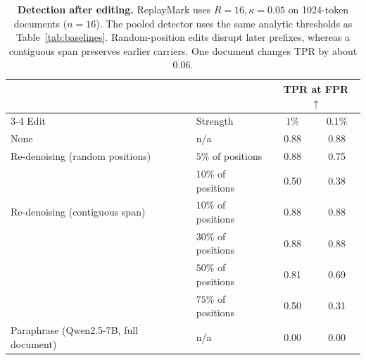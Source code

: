 \begin{table}[H]
\centering
\small
\renewcommand{\arraystretch}{0.86}
\begin{tabular}{llcc}
\toprule
& & \multicolumn{2}{c}{TPR at FPR $\uparrow$} \\
\cmidrule(lr){3-4}
Edit & Strength & $1\%$ & $0.1\%$ \\
\midrule
None & n/a & 0.88 & 0.88 \\
Re-denoising (random positions) & $5\%$ of positions & 0.88 & 0.75 \\
                                & $10\%$ of positions & 0.50 & 0.38 \\
Re-denoising (contiguous span)  & $10\%$ of positions & 0.88 & 0.88 \\
                                & $30\%$ of positions & 0.88 & 0.88 \\
                                & $50\%$ of positions & 0.81 & 0.69 \\
                                & $75\%$ of positions & 0.50 & 0.31 \\
Paraphrase (Qwen2.5-7B, full document) & n/a & 0.00 & 0.00 \\
\bottomrule
\end{tabular}
\setlength{\abovecaptionskip}{3pt}
\caption{\textbf{Detection after editing.} ReplayMark uses $R=16,\kappa=0.05$ on 1024-token
documents ($n=16$). The pooled detector uses the same analytic thresholds as
Table~\ref{tab:baselines}. Random-position edits disrupt later prefixes, whereas a contiguous span
preserves earlier carriers. One document changes TPR by about $0.06$.}
\label{tab:robustness}
\end{table}
